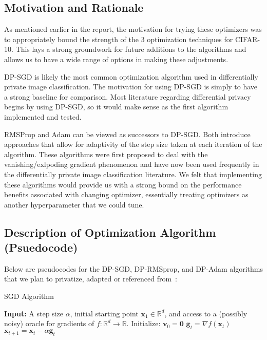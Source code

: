 \subsection{Motivation and Rationale}\label{subsec:motivation-and-rationale}

As mentioned earlier in the report, the motivation for trying these optimizers was to appropriately bound the strength of the 3 optimization techniques for CIFAR-10. 
This lays a strong groundwork for future additions to the algorithms and allows us to have a wide range of options in making these adjustments. 

DP-SGD is likely the most common optimization algorithm used in differentially private image classification. The motivation for using DP-SGD is simply to have a strong 
baseline for comparison. Most literature regarding differential privacy begins by using DP-SGD, so it would make sense as the first algorithm implemented and tested.

RMSProp and Adam can be viewed as successors to DP-SGD. Both introduce approaches that allow for adaptivity of the step size taken at each iteration of the algorithm. These algorithms
were first proposed to deal with the vanishing/exlpoding gradient phenomenon and have now been used frequently in the differentially private image classification literature. We felt that
implementing these algorithms would provide us with a strong bound on the performance benefits associated with changing optimizer, essentially treating optimizers as another hyperparameter
that we could tune.

\subsection{Description of Optimization Algorithm (Psuedocode)}\label{subsec:algorithm-description}

Below are pseudocodes for the DP-SGD, DP-RMSprop, and DP-Adam algorithms that we plan to privatize, adapted or referenced from~\cite{DBLP:journals/corr/abs-1807-06766}:
\begin{algorithm}
    \caption{SGD Algorithm}
    \label{alg:sgd}
    \begin{algorithmic}[1]
        \State \textbf{Input:} A step size $\alpha$, initial starting point $\mathbf{x}_1 \in \mathbb{R}^d$,
        and access to a (possibly noisy) oracle for gradients of $f : \mathbb{R}^d \rightarrow \mathbb{R}$.
            \State Initialize: $\mathbf{v}_0 = \mathbf{0}$
                \State $\mathbf{g}_t = \nabla f(\mathbf{x}_t)$
                \State $\mathbf{x}_{t+1} = \mathbf{x}_t - \alpha \mathbf{g}_t$
            \EndFor
        \EndFunction
    \end{algorithmic}
\end{algorithm}
\vspace{-1cm}

